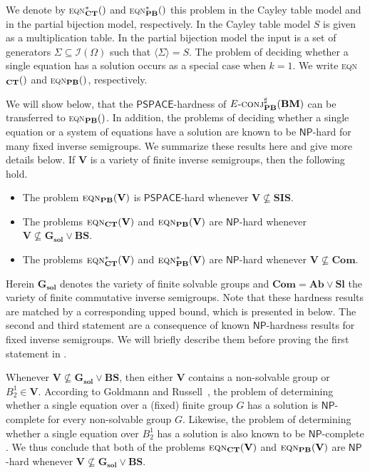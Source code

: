 \documentclass[anonymous,letter,UKenglish,cleveref,autoref,thm-restate]{lipics-v2021}
\newcommand{\gen}[1]{\langle #1 \rangle}
\newcommand{\NP}{\ensuremath{\mathsf{NP}}\xspace}
\newcommand{\PSPACE}{\ensuremath{\mathsf{PSPACE}}\xspace}
\newcommand{\vV}{\ensuremath{\mathbf{V}}}
\newcommand{\vAb}{\ensuremath{\mathbf{Ab}}}
\newcommand{\vGSol}{\ensuremath{\mathbf{G_{\text{sol}}}}}
\newcommand{\vSl}{\ensuremath{\mathbf{Sl}}}
\newcommand{\vSI}{\ensuremath{\mathbf{SIS}}}
\newcommand{\vCom}{\ensuremath{\mathbf{Com}}}
\newcommand{\vBS}{\ensuremath{\mathbf{BS}}}  \newcommand{\vBM}{\ensuremath{\mathbf{BM}}}
\newcommand{\ISym}{\cI}
\newcommand{\cI}{\mathcal{I}}
\theoremstyle{plain}
\theoremstyle{plain}
\newcommand{\dConjS}[2][]{\textup{\textsc{conj${}^{\sharp}_{\mathbf{#1}}\expandafter\ifx\expandafter\relax\detokenize{#2}\relax\else(#2)\fi$}}}
\newcommand{\dEqn}[2][]{\textup{\textsc{eqn${}_{\mathbf{#1}}\expandafter\ifx\expandafter\relax\detokenize{#2}\relax\else(#2)\fi$}}}
\newcommand{\dEqnSys}[2][]{\textup{\textsc{eqn${}^\ast_{\mathbf{#1}}\expandafter\ifx\expandafter\relax\detokenize{#2}\relax\else(#2)\fi$}}}
\newcommand{\dEConjS}[2][]{\ensuremath{E}\textnormal{-}\dConjS[#1]{#2}}
\begin{document}
We denote by \dEqnSys[CT]{} and \dEqnSys[PB]{} this problem in the Cayley table model and in the partial bijection model, respectively.
In the Cayley table model $S$ is given as a multiplication table.
In the partial bijection model the input is a set of generators $\Sigma \subseteq \ISym(\Omega)$ such that $\gen{\Sigma} = S$.
The problem of deciding whether a single equation has a solution occurs as a special case when $k = 1$.
We write \dEqn[CT]{} and \dEqn[PB]{}, respectively.

We will show below, that the $\PSPACE$-hardness of $\dEConjS[PB]{\vBM}$ can be transferred to \dEqn[PB]{}.
In addition, the problems of deciding whether a single equation or a system of equations have a solution are known to be $\NP$-hard for many fixed inverse semigroups.
We summarize these results here and give more details below.
If $\vV$ is a variety of finite inverse semigroups, then the following hold.
\begin{itemize}
  \item The problem $\dEqn[PB]{\vV}$ is $\PSPACE$-hard whenever $\vV \not\subseteq \vSI$.
  \item The problems $\dEqn[CT]{\vV}$ and $\dEqn[PB]{\vV}$ are $\NP$-hard whenever $\vV \not\subseteq \vGSol \vee \vBS$.
  \item The problems $\dEqnSys[CT]{\vV}$ and $\dEqnSys[PB]{\vV}$ are $\NP$-hard whenever $\vV \not\subseteq \vCom$.
\end{itemize}

Herein $\vGSol$ denotes the variety of finite solvable groups and $\vCom = \vAb \vee \vSl$ the variety of finite commutative inverse semigroups.
Note that these hardness results are matched by a corresponding upped bound, which is presented in  below.
The second and third statement are a consequence of known $\NP$-hardness results for fixed inverse semigroups.
We will briefly describe them before proving the first statement in .

Whenever $\vV \not\subseteq \vGSol \vee \vBS$, then either $\vV$ contains a non-solvable group or $B^1_2 \in \vV$.
According to Goldmann and Russell~\cite{GoldmannR02}, the problem of determining whether a single equation over a (fixed) finite group $G$ has a solution is $\NP$-complete for every non-solvable group $G$.
Likewise, the problem of determining whether a single equation over $B^1_2$ has a solution is also known to be $\NP$-complete \cite[Theorem 6]{BarringtonMMTT00}.
We thus conclude that both of the problems $\dEqn[CT]{\vV}$ and $\dEqn[PB]{\vV}$ are $\NP$-hard whenever $\vV \not\subseteq \vGSol \vee \vBS$.
\end{document}

